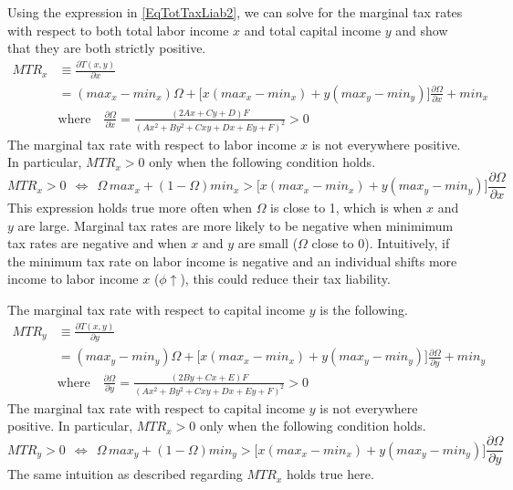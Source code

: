 \documentclass[letterpaper,12pt]{article}
\theoremstyle{definition}
\begin{document}
\begin{spacing}{1.5}
    Using the expression in \eqref{EqTotTaxLiab2}, we can solve for the marginal tax rates with respect to both total labor income $x$ and total capital income $y$ and show that they are both strictly positive.
    \begin{equation}\label{EqMTRx}
      \begin{split}
        MTR_x &\equiv \frac{\partial T(x,y)}{\partial x} \\
        &= (max_x - min_x)\Omega + \bigl[x(max_x - min_x) + y(max_y - min_y)\bigr]\frac{\partial\Omega}{\partial x} + min_x \\
        &\text{where}\quad \frac{\partial\Omega}{\partial x} = \frac{(2Ax + Cy + D)F}{(Ax^2 + By^2 + Cxy + Dx + Ey + F)^2} > 0
      \end{split}
    \end{equation}
    The marginal tax rate with respect to labor income $x$ is not everywhere positive. In particular, $MTR_x>0$ only when the following condition holds.
    \begin{equation}\label{EqMTRxpos}
      MTR_x>0 \:\:\Leftrightarrow\:\: \Omega\,max_x + (1 - \Omega)min_x > \bigl[x(max_x - min_x) + y(max_y - min_y)\bigr]\frac{\partial\Omega}{\partial x}
    \end{equation}
    This expression holds true more often when $\Omega$ is close to 1, which is when $x$ and $y$ are large. Marginal tax rates are more likely to be negative when minimimum tax rates are negative and when $x$ and $y$ are small ($\Omega$ close to 0). Intuitively, if the minimum tax rate on labor income is negative and an individual shifts more income to labor income $x$ ($\phi\uparrow$), this could reduce their tax liability.

    The marginal tax rate with respect to capital income $y$ is the following.
    \begin{equation}\label{EqMTRy}
      \begin{split}
        MTR_y &\equiv \frac{\partial T(x,y)}{\partial y} \\
        &= (max_y - min_y)\Omega + \bigl[x(max_x - min_x) + y(max_y - min_y)\bigr]\frac{\partial\Omega}{\partial y} + min_y \\
        &\text{where}\quad \frac{\partial\Omega}{\partial y} = \frac{(2By + Cx + E)F}{(Ax^2 + By^2 + Cxy + Dx + Ey + F)^2} > 0
      \end{split}
    \end{equation}
    The marginal tax rate with respect to capital income $y$ is not everywhere positive. In particular, $MTR_x>0$ only when the following condition holds.
    \begin{equation}\label{EqMTRypos}
      MTR_y>0 \:\:\Leftrightarrow\:\: \Omega\,max_y + (1 - \Omega)min_y > \bigl[x(max_x - min_x) + y(max_y - min_y)\bigr]\frac{\partial\Omega}{\partial y}
    \end{equation}
    The same intuition as described regarding $MTR_x$ holds true here.


\end{spacing}
\end{document}
